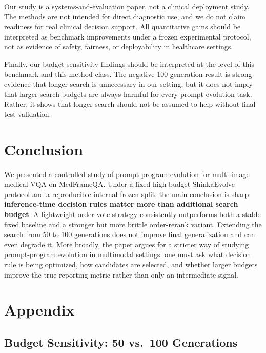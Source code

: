\documentclass[11pt]{article}
\begin{document}
Our study is a systems-and-evaluation paper, not a clinical deployment study. The methods are not intended for direct diagnostic use, and we do not claim readiness for real clinical decision support. All quantitative gains should be interpreted as benchmark improvements under a frozen experimental protocol, not as evidence of safety, fairness, or deployability in healthcare settings.

Finally, our budget-sensitivity findings should be interpreted at the level of this benchmark and this method class. The negative 100-generation result is strong evidence that longer search is unnecessary in our setting, but it does not imply that larger search budgets are always harmful for every prompt-evolution task. Rather, it shows that longer search should not be assumed to help without final-test validation.

\section{Conclusion}

We presented a controlled study of prompt-program evolution for multi-image medical VQA on MedFrameQA. Under a fixed high-budget ShinkaEvolve protocol and a reproducible internal frozen split, the main conclusion is sharp: \textbf{inference-time decision rules matter more than additional search budget}. A lightweight order-vote strategy consistently outperforms both a stable fixed baseline and a stronger but more brittle order-rerank variant. Extending the search from 50 to 100 generations does not improve final generalization and can even degrade it. More broadly, the paper argues for a stricter way of studying prompt-program evolution in multimodal settings: one must ask what decision rule is being optimized, how candidates are selected, and whether larger budgets improve the true reporting metric rather than only an intermediate signal.





\newpage
\appendix
\section{Appendix}

\subsection{Budget Sensitivity: 50 vs.\ 100 Generations}
\end{document}

